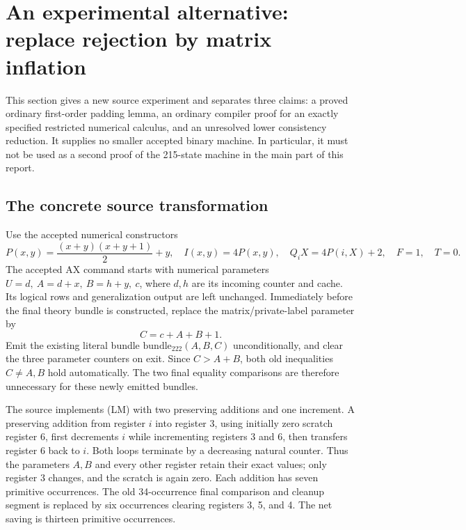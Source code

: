 \section{An experimental alternative: replace rejection by matrix inflation}
\label{sec:large-matrix-research}

This section gives a new source experiment and separates three claims: a
proved ordinary first-order padding lemma, an ordinary compiler proof for
an exactly specified restricted numerical calculus, and an unresolved
lower consistency reduction. It supplies no smaller accepted binary
machine. In particular, it must not be used as a second proof of the
215-state machine in the main part of this report.

\subsection{The concrete source transformation}

Use the accepted numerical constructors
\[
 P(x,y)=\frac{(x+y)(x+y+1)}2+y,\quad I(x,y)=4P(x,y),\quad
 Q_iX=4P(i,X)+2,\quad F=1,\quad T=0.
\]
The accepted AX command starts with numerical parameters
\(U=d,\ A=d+x,\ B=h+y,\ c\), where \(d,h\) are its incoming
counter and cache. Its logical rows and generalization output are left
unchanged. Immediately before the final theory bundle is constructed,
replace the matrix/private-label parameter by
\[
                         C=c+A+B+1.                 \tag{LM}
\]
Emit the existing literal bundle \(\mathrm{bundle}_{222}(A,B,C)\)
unconditionally, and clear the three parameter counters on exit. Since
\(C>A+B\), both old inequalities \(C\ne A,B\) hold automatically.
The two final equality comparisons are therefore unnecessary for these
newly emitted bundles.

The source implements (LM) with two preserving additions and one
increment. A preserving addition from register \(i\) into register 3,
using initially zero scratch register 6, first decrements \(i\) while
incrementing registers 3 and 6, then transfers register 6 back to
\(i\). Both loops terminate by a decreasing natural counter. Thus the
parameters \(A,B\) and every other register retain their exact values;
only register 3 changes, and the scratch is again zero. Each addition
has seven primitive occurrences. The old 34-occurrence final comparison
and cleanup segment is replaced by six occurrences clearing registers
3, 5, and 4. The net saving is thirteen primitive occurrences.

